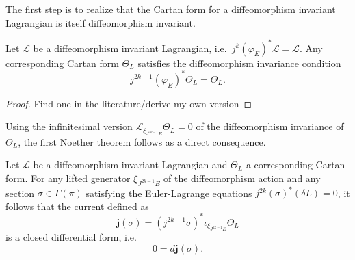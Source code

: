 The first step is to realize that the Cartan form for a diffeomorphism invariant Lagrangian is itself diffeomorphism invariant.
\begin{proposition}[\cite{}]\label{prop_cartan_diffeo}
  Let $\mathscr L$ be a diffeomorphism invariant Lagrangian, i.e.~$j^k(\varphi_E)^\ast \mathscr L=\mathscr L$. Any corresponding Cartan form $\Theta_L$ satisfies the diffeomorphism invariance condition
  \begin{equation}
    j^{2k-1}(\varphi_E)^\ast \Theta_L = \Theta_L.
  \end{equation}
\end{proposition}
\begin{proof}
  Find one in the literature/derive my own version
\end{proof}
Using the infinitesimal version $\mathcal L_{\xi_{J^{2k-1}E}} \Theta_L = 0$ of the diffeomorphism invariance of $\Theta_L$, the first Noether theorem follows as a direct consequence.
\begin{theorem}\label{thm_first_noether}
  Let $\mathscr L$ be a diffeomorphism invariant Lagrangian and $\Theta_L$ a corresponding Cartan form. For any lifted generator $\xi_{J^{2k-1}E}$ of the diffeomorphism action and any section $\sigma\in\Gamma(\pi)$ satisfying the Euler-Lagrange equations $j^{2k}(\sigma)^\ast(\delta L)=0$, it follows that the current defined as
  \begin{equation}
    \boldsymbol{j}(\sigma) = (j^{2k-1}\sigma)^\ast \iota_{\xi_{J^{2k-1}E}} \Theta_L
  \end{equation}
  is a closed differential form, i.e.~
  \begin{equation}\label{first_noether_eq}
    0 = d \boldsymbol{j}(\sigma).
  \end{equation}
\end{theorem}
